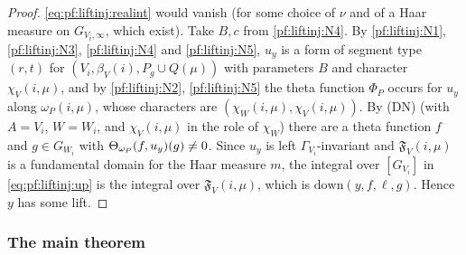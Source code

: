 \begin{proof}
\eqref{eq:pf:liftinj:realint} would vanish (for some choice of $\nu$ and of a Haar measure on $G_{V_i,\infty}$, which exist). Take $B,c$ from
\ref{pf:liftinj:N4}. By \ref{pf:liftinj:N1}, \ref{pf:liftinj:N3}, \ref{pf:liftinj:N4} and \ref{pf:liftinj:N5}, $u_y$ is a form of segment type
$(r,t)$ for $(V_i,\beta_V(i),P_g\cup Q(\mu))$ with parameters $B$ and character $\chi_V(i,\mu)$, and by \ref{pf:liftinj:N2}, \ref{pf:liftinj:N5} the
theta function $\Phi_P$ occurs for $u_y$ along $\omega_P(i,\mu)$, whose characters are $(\chi_W(i,\mu),\chi_V(i,\mu))$. By (DN) (with $A=V_i$,
$W=W_i$, and $\chi_V(i,\mu)$ in the role of $\chi_W$) there are a theta function $f$ and $g\in G_{W_i}$ with $\Theta_{\omega_P}(f,u_y)(g)\ne0$.
Since $u_y$ is left $\Gamma_{V_i}$-invariant and $\mathfrak F_V(i,\mu)$ is a fundamental domain for the Haar measure $m$, the integral over $[G_{V_i}]$
in \eqref{eq:pf:liftinj:up} is the integral over $\mathfrak F_V(i,\mu)$, which is $\mathrm{down}(y,f,\ell,g)$. Hence $y$ has some lift.
\end{proof}

\subsubsection{The main theorem}

